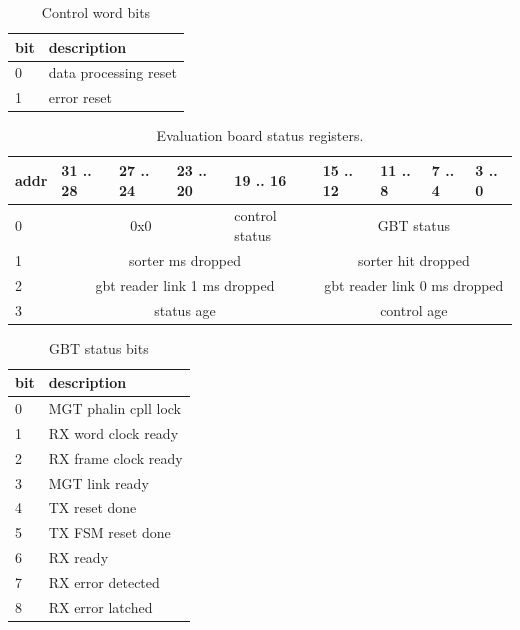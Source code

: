 \documentclass{article}
\begin{document}
\begin{table}[H]
\centering
\begin{tabular}{| l | l |}
\hline
bit & description \\ \hline
0 & data processing reset \\ \hline
1 & error reset \\ \hline
\end{tabular}
\caption{Control word bits\label{tab12}}
\end{table}



\begin{table}[H]
\centering
\begin{tabular}{| l | l | l | l | l | l | l | l | l |}
\hline
addr & 31 .. 28 & 27 .. 24 & 23 .. 20 & 19 .. 16 & 15 .. 12 & 11 .. 8 & 7 .. 4 & 3 .. 0 \\ \hline
0 & \multicolumn{3}{c|}{0x0} & control status  & \multicolumn{4}{c|}{GBT status} \\ \hline
1 & \multicolumn{4}{c|}{sorter ms dropped}  & \multicolumn{4}{c|}{sorter hit dropped} \\ \hline
2 & \multicolumn{4}{c|}{gbt reader link 1 ms dropped}  & \multicolumn{4}{c|}{gbt reader link 0 ms dropped} \\ \hline
3 & \multicolumn{4}{c|}{status age}& \multicolumn{4}{c|}{control age} \\ \hline

\end{tabular}
\caption{Evaluation board status registers.\label{tab13}}
\end{table}

\begin{table}[H]
\centering
\begin{tabular}{| l | l |}
\hline
bit & description \\ \hline
0 & MGT phalin cpll lock \\ \hline
1 & RX word clock ready \\ \hline
2 & RX frame clock ready \\ \hline
3 & MGT link ready \\ \hline
4 & TX reset done \\ \hline
5 & TX FSM reset done \\ \hline
6 & RX ready \\ \hline
7 & RX error detected \\ \hline
8 & RX error latched \\ \hline
\end{tabular}
\caption{GBT status bits\label{tab14}}
\end{table}
\end{document}
